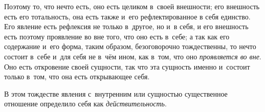 Поэтому то, что нечто есть, оно есть целиком в~своей внешности; его
внешность есть его тотальность, она есть также и~его рефлектированное в
себя единство. Его явление есть рефлексия не только в~другое, но и~в себя,
и его внешность есть поэтому проявление во вне того, что оно есть в~себе; а
так как его содержание и~его форма, таким образом, безоговорочно
тождественны, то нечто состоит в~себе и~для себя не в~чём ином, как в~том,
что оно {\em проявляется во вне}. Оно есть откровение
своей сущности, так что эта сущность именно и~состоит только в~том, что она
есть открывающее себя.

В этом тождестве явления с~внутренним или сущностью существенное отношение
определило себя как {\em действительность}.

